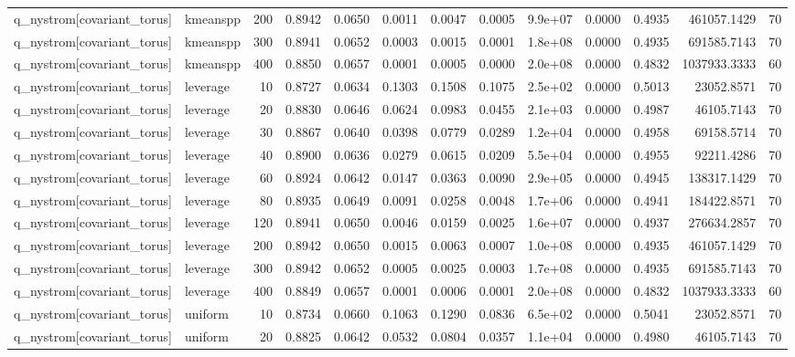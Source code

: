 \begin{table}
\begin{tabular}{llrrrrrrlrrrr}
q\_nystrom[covariant\_torus] & kmeanspp & 200 & 0.8942 & 0.0650 & 0.0011 & 0.0047 & 0.0005 & 9.9e+07 & 0.0000 & 0.4935 & 461057.1429 & 70 \\
q\_nystrom[covariant\_torus] & kmeanspp & 300 & 0.8941 & 0.0652 & 0.0003 & 0.0015 & 0.0001 & 1.8e+08 & 0.0000 & 0.4935 & 691585.7143 & 70 \\
q\_nystrom[covariant\_torus] & kmeanspp & 400 & 0.8850 & 0.0657 & 0.0001 & 0.0005 & 0.0000 & 2.0e+08 & 0.0000 & 0.4832 & 1037933.3333 & 60 \\
q\_nystrom[covariant\_torus] & leverage & 10 & 0.8727 & 0.0634 & 0.1303 & 0.1508 & 0.1075 & 2.5e+02 & 0.0000 & 0.5013 & 23052.8571 & 70 \\
q\_nystrom[covariant\_torus] & leverage & 20 & 0.8830 & 0.0646 & 0.0624 & 0.0983 & 0.0455 & 2.1e+03 & 0.0000 & 0.4987 & 46105.7143 & 70 \\
q\_nystrom[covariant\_torus] & leverage & 30 & 0.8867 & 0.0640 & 0.0398 & 0.0779 & 0.0289 & 1.2e+04 & 0.0000 & 0.4958 & 69158.5714 & 70 \\
q\_nystrom[covariant\_torus] & leverage & 40 & 0.8900 & 0.0636 & 0.0279 & 0.0615 & 0.0209 & 5.5e+04 & 0.0000 & 0.4955 & 92211.4286 & 70 \\
q\_nystrom[covariant\_torus] & leverage & 60 & 0.8924 & 0.0642 & 0.0147 & 0.0363 & 0.0090 & 2.9e+05 & 0.0000 & 0.4945 & 138317.1429 & 70 \\
q\_nystrom[covariant\_torus] & leverage & 80 & 0.8935 & 0.0649 & 0.0091 & 0.0258 & 0.0048 & 1.7e+06 & 0.0000 & 0.4941 & 184422.8571 & 70 \\
q\_nystrom[covariant\_torus] & leverage & 120 & 0.8941 & 0.0650 & 0.0046 & 0.0159 & 0.0025 & 1.6e+07 & 0.0000 & 0.4937 & 276634.2857 & 70 \\
q\_nystrom[covariant\_torus] & leverage & 200 & 0.8942 & 0.0650 & 0.0015 & 0.0063 & 0.0007 & 1.0e+08 & 0.0000 & 0.4935 & 461057.1429 & 70 \\
q\_nystrom[covariant\_torus] & leverage & 300 & 0.8942 & 0.0652 & 0.0005 & 0.0025 & 0.0003 & 1.7e+08 & 0.0000 & 0.4935 & 691585.7143 & 70 \\
q\_nystrom[covariant\_torus] & leverage & 400 & 0.8849 & 0.0657 & 0.0001 & 0.0006 & 0.0001 & 2.0e+08 & 0.0000 & 0.4832 & 1037933.3333 & 60 \\
q\_nystrom[covariant\_torus] & uniform & 10 & 0.8734 & 0.0660 & 0.1063 & 0.1290 & 0.0836 & 6.5e+02 & 0.0000 & 0.5041 & 23052.8571 & 70 \\
q\_nystrom[covariant\_torus] & uniform & 20 & 0.8825 & 0.0642 & 0.0532 & 0.0804 & 0.0357 & 1.1e+04 & 0.0000 & 0.4980 & 46105.7143 & 70 \\

\end{tabular}
\end{table}
